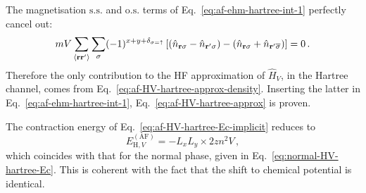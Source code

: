 \begin{tabproof}
	The magnetisation $\mathrm{s.s.}$ and $\mathrm{o.s.}$ terms of Eq.~\eqref{eq:af-ehm-hartree-int-1} perfectly cancel out:
	\[
	mV \sum_{\ev{\mathbf{r}\mathbf{r}'}} \sum_\sigma (-1)^{x+y+\delta_{\sigma=\uparrow}} \left[ \left(
	\hat n_{\mathbf{r}\sigma} - \hat n_{\mathbf{r}'\sigma}
	\right) - \left(
	\hat n_{\mathbf{r}\sigma} + \hat n_{\mathbf{r}'\overline{\sigma}}
	\right)
	\right] = 0 \, .
	\]
	Therefore the only contribution to the HF approximation of $\hat H_V$, in the Hartree channel, comes from Eq.~\eqref{eq:af-HV-hartree-approx-density}. Inserting the latter in Eq.~\eqref{eq:af-ehm-hartree-int-1}, Eq.~\eqref{eq:af-HV-hartree-approx} is proven.
\end{tabproof}

The contraction energy of Eq.~\eqref{eq:af-HV-hartree-Ec-implicit} reduces to
\begin{equation}\label{eq:af-HV-hartree-Ec}
	E_{\mathrm{H},V}^{(\mathrm{AF})} = - L_x L_y \times 2zn^2V  \, ,
\end{equation}
which coincides with that for the normal phase, given in Eq.~\eqref{eq:normal-HV-hartree-Ec}. This is coherent with the fact that the shift to chemical potential is identical.


